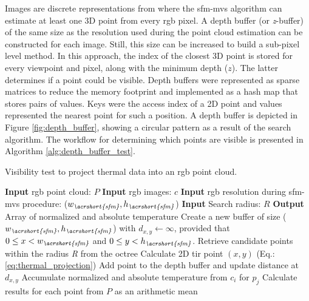 Images are discrete representations from where the \acrshort{sfm}-\acrshort{mvs} algorithm can estimate at least one 3D point from every \acrshort{rgb} pixel. A depth buffer (or \textit{z}-buffer) of the same size as the resolution used during the point cloud estimation can be constructed for each image. Still, this size can be increased to build a sub-pixel level method. In this approach, the index of the closest 3D point is stored for every viewpoint and pixel, along with the minimum depth ($\textit{z}$). The latter determines if a point could be visible. Depth buffers were represented as sparse matrices to reduce the memory footprint and implemented as a hash map that stores pairs of values. Keys were the access index of a 2D point and values represented the nearest point for such a position. A depth buffer is depicted in Figure \ref{fig:depth_buffer}, showing a circular pattern as a result of the search algorithm. The workflow for determining which points are visible is presented in Algorithm \ref{alg:depth_buffer_test}.  

\begin{algorithm}
    \small
	\caption{Visibility test to project thermal data into an \acrshort{rgb} point cloud. }
	\label{alg:depth_buffer_test}
    \begin{algorithmic}[1]
        \State \textbf{Input} \acrshort{rgb} point cloud: $P$
    	\State \textbf{Input} \acrshort{rgb} images: $c$
    	\State \textbf{Input} \acrshort{rgb} resolution during \acrshort{sfm}-\acrshort{mvs} procedure: ($w_{\textit{\acrshort{sfm}}}, h_{\textit{\acrshort{sfm}}}$)
    	\State \textbf{Input} Search radius: $R$
        \State \textbf{Output} Array of normalized and absolute temperature
		    \State Create a new buffer of size ($w_{\textit{\acrshort{sfm}}}, h_{\textit{\acrshort{sfm}}}$) with $d_{x,y} \gets \infty$, provided that $0 \leq x < w_{\textit{\acrshort{sfm}}}$ and $0 \leq y < h_{\textit{\acrshort{sfm}}}$.
		    \State Retrieve candidate points within the radius \textit{R} from the octree
		        \State Calculate 2D \acrshort{tir} point $(x, y)$ (Eq.: \ref{eq:thermal_projection})
		                \State Add point to the depth buffer and update distance at $d_{x, y}$
	    	        \EndIf
	    	    \EndIf
		    \EndFor
		        \State Accumulate normalized and absolute temperature from $c_i$ for $p_j$
		    \EndFor
		\EndFor
		\State Calculate results for each point from $P$ as an arithmetic mean %
	\end{algorithmic} 
    \normalsize
\end{algorithm}

